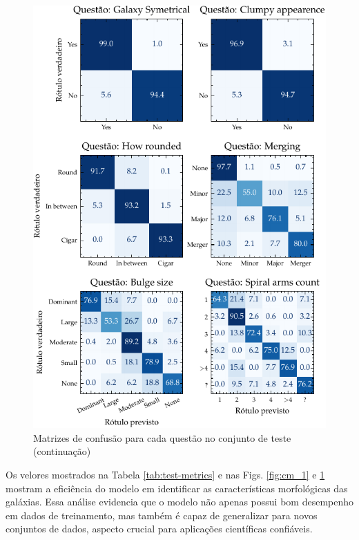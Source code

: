 \begin{figure}[!ht]
  \centering
  \caption{Matrizes de confusão para cada questão no conjunto de teste (continuação)}
  \label{fig:cm_2}
  \includegraphics[width=\linewidth]{notebooks/plots/cm_2.pdf}
\end{figure}


Os velores mostrados na Tabela \ref{tab:test-metrics} e nas Figs. \ref{fig:cm_1} e \ref{fig:cm_2} mostram a eficiência do modelo em identificar as características morfológicas das galáxias. Essa análise evidencia que o modelo não apenas possui bom desempenho em dados de treinamento, mas também é capaz de generalizar para novos conjuntos de dados, aspecto crucial para aplicações científicas confiáveis.

\chaptersep
